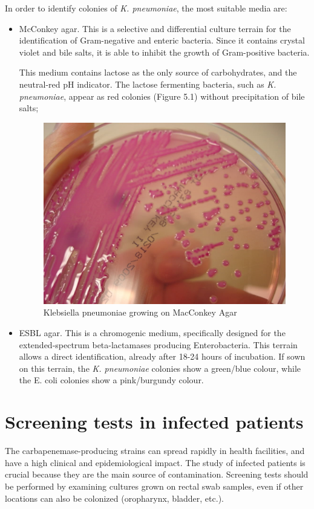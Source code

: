 \documentclass[11pt]{report}
\begin{document}
In order to identify colonies of \emph{K. pneumoniae}, the most suitable media are:
\begin{itemize}
\item McConkey agar.
This is a selective and differential culture terrain for the identification of Gram-negative and enteric bacteria.
Since it contains crystal violet and bile salts, it is able to inhibit the growth of Gram-positive bacteria. 

This medium contains lactose as the only source of carbohydrates, and the neutral-red pH indicator.
The lactose fermenting bacteria, such as \emph{K. pneumoniae}, appear as red colonies (Figure 5.1) without precipitation of bile salts;

\begin{figure}[htp]
\centering
\includegraphics[scale=0.250]{img/KlebsiellaMAC.jpg}
\caption{Klebsiella pneumoniae growing on MacConkey Agar \cite{KlebsiellaMAC}}
\label{}
\end{figure}

\clearpage
\item ESBL agar.
This is a chromogenic medium, specifically designed for the extended-spectrum beta-lactamases producing Enterobacteria. This terrain allows a direct identification, already after 18-24 hours of incubation.
If sown on this terrain, the \emph{K. pneumoniae} colonies show a green/blue colour, while the E. coli colonies show a pink/burgundy colour.
\end{itemize}

\section{Screening tests in infected patients}
The carbapenemase-producing strains can spread rapidly in health facilities, and have a high clinical and epidemiological impact.
The study of infected patients is crucial because they are the main source of contamination.
Screening tests should be performed by examining cultures grown on rectal swab samples, even if other locations can also be colonized (oropharynx, bladder, etc.).
\end{document}
